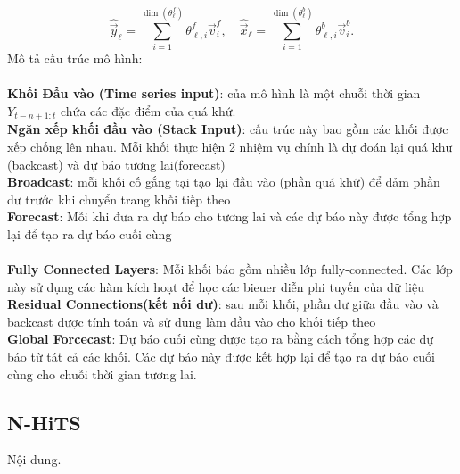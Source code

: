 \[\widehat{\vec{y}}_{\ell} = \sum_{i=1}^{\dim(\theta^f_{\ell})} \theta^f_{\ell,i} \vec{v}^f_{i}, \quad  \widehat{\vec{x}}_{\ell} = \sum_{i=1}^{\dim(\theta^b_{\ell})} \theta^b_{\ell,i} \vec{v}^b_{i}.
\]
Mô tả cấu trúc mô hình: \\
\\
\textbf{Khối Đầu vào (Time series input)}: của mô hình là một chuỗi thời gian \(Y_{t-n+1:t}\) chứa các đặc điểm của quá khứ.\\
\textbf{Ngăn xếp khối đầu vào (Stack Input)}: cấu trúc này bao gồm các khối được xếp chống lên nhau. Mỗi khối thực hiện 2 nhiệm vụ chính là dự đoán lại quá khư (backcast) và dự báo tương lai(forecast)\\
\textbf{Broadcast}: mỗi khối cố  gắng tại tạo lại đầu vào (phần quá khứ) để dảm phần dư trước khi chuyển trang khối tiếp theo\\
\textbf{Forecast}: Mỗi khi đưa ra dự báo cho tương lai và các dự báo này được tổng hợp lại để tạo ra dự báo cuối cùng\\
\\
\textbf{Fully Connected Layers}: Mỗi khối báo gồm nhiều lớp fully-connected. Các lớp này sử dụng các hàm kích hoạt để học các bieuer diễn phi tuyến của dữ liệu\\
\textbf{Residual Connections(kết nối dư)}: sau mỗi khối, phần dư giữa đầu vào và backcast được tính toán và sử dụng làm đầu vào cho khối tiếp theo\\
\textbf{Global Forcecast}: Dự báo cuối cùng được tạo ra bằng cách tổng hợp các dự báo từ tát cả các khối. Các dự báo này được kết hợp lại để tạo ra dự báo cuối cùng cho chuỗi thời gian tương lai.\\

\subsection{N-HiTS}
Nội dung.